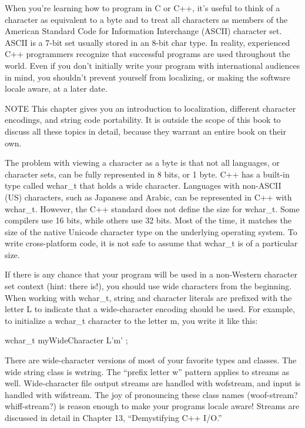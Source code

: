 
When you’re learning how to program in C or C++, it’s useful to think of a character as equivalent to a byte and to treat all characters as members of the American Standard Code for Information Interchange (ASCII) character set. ASCII is a 7-bit set usually stored in an 8-bit char type. In reality, experienced C++ programmers recognize that successful programs are used throughout the world. Even if you don’t initially write your program with international audiences in mind, you shouldn’t prevent yourself from localizing, or making the software locale aware, at a later date.

\begin{myNotic}{NOTE}
This chapter gives you an introduction to localization, different character encodings, and string code portability. It is outside the scope of this book to discuss all these topics in detail, because they warrant an entire book on their own.
\end{myNotic}


The problem with viewing a character as a byte is that not all languages, or character sets, can be fully represented in 8 bits, or 1 byte. C++ has a built-in type called wchar\_t that holds a wide character. Languages with non-ASCII (US) characters, such as Japanese and Arabic, can be represented in C++ with wchar\_t. However, the C++ standard does not define the size for wchar\_t. Some compilers use 16 bits, while others use 32 bits. Most of the time, it matches the size of the native Unicode character type on the underlying operating system. To write cross-platform code, it is not safe to assume that wchar\_t is of a particular size.

If there is any chance that your program will be used in a non-Western character set context (hint: there is!), you should use wide characters from the beginning. When working with wchar\_t, string and character literals are prefixed with the letter L to indicate that a wide-character encoding should be used. For example, to initialize a wchar\_t character to the letter m, you write it like this:

\begin{cpp}
wchar_t myWideCharacter { L'm' };
\end{cpp}

There are wide-character versions of most of your favorite types and classes. The wide string class is wstring. The “prefix letter w” pattern applies to streams as well. Wide-character file output streams are handled with wofstream, and input is handled with wifstream. The joy of pronouncing these class names (woof-stream? whiff-stream?) is reason enough to make your programs locale aware! Streams are discussed in detail in Chapter 13, “Demystifying C++ I/O.”

